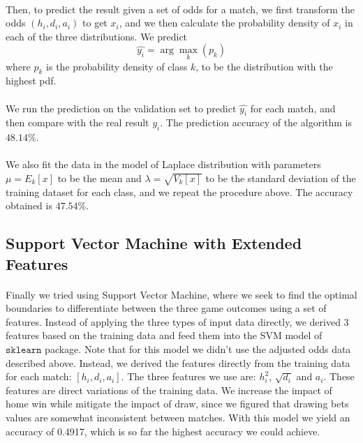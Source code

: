 \documentclass[12pt]{article}
\begin{document}
\paragraph{}
Then, to predict the result given a set of odds for a match, we first transform the odds $(h_i, d_i, a_i)$ to get $x_i$, and we then calculate the probability density of $x_i$ in each of the three distributions. We predict \[
\hat{y_i} = \arg\max_k(p_k)
\] where $p_k$ is the probability density of class $k$, to be the distribution with the highest pdf.
\paragraph{}
We run the prediction on the validation set to predict $\hat{y_i}$ for each match, and then compare with the real result $y_i$. The prediction accuracy of the algorithm is $48.14 \%$.
\paragraph{}
We also fit the data in the model of Laplace distribution with parameters $\mu = 
E_k[x]$ to be the mean and $\lambda = \sqrt{V_k[x]}$ to be the standard deviation of the training dataset for each class, and we repeat the procedure above. The accuracy obtained is $47.54\%$.
\subsection{Support Vector Machine with Extended Features}

\paragraph{}
Finally we tried using Support Vector Machine, where we seek to find the optimal boundaries to differentiate between the three game outcomes using a set of features. Instead of applying the three types of input data directly, we derived 3 features based on the training data and feed them into the SVM model of $\texttt{sklearn}$ package. Note that for this model we didn't use the adjusted odds data described above. Instead, we derived the features directly from the training data for each match: $[h_i, d_i, a_i]$. The three features we use are: $h_i^2$, $\sqrt{d_i}$ and $a_i$. These features are direct variations of the training data. We increase the impact of home win while mitigate the impact of draw, since we figured that drawing bets values are somewhat inconsistent between matches. With this model we yield an accuracy of 0.4917, which is so far the highest accuracy we could achieve.
\end{document}
